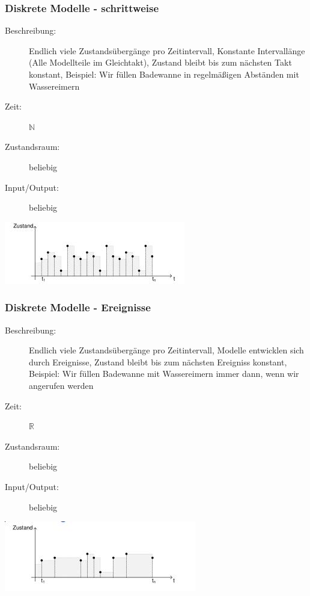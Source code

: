 \documentclass[11pt, fleqn, a4paper, leqno]{scrartcl} %
\begin{document}
		\subsubsection{Diskrete Modelle - schrittweise}
			\begin{description}
				\item[Beschreibung:] Endlich viele Zustandsübergänge pro Zeitintervall, Konstante Intervallänge (Alle Modellteile im Gleichtakt), Zustand bleibt bis zum nächsten Takt konstant, Beispiel: Wir füllen Badewanne in regelmäßigen Abständen mit Wassereimern
				\item[Zeit:]$\mathds{N}$
				\item[Zustandsraum:] beliebig
				\item[Input/Output:] beliebig
			\end{description}
			\begin{center}
				\includegraphics [scale=0.6]{images/diskret-schrittweise.jpg}
			\end{center}
		\subsubsection{Diskrete Modelle - Ereignisse}
			\begin{description}
				\item[Beschreibung:] Endlich viele Zustandsübergänge pro Zeitintervall, Modelle entwicklen sich durch Ereignisse, Zustand bleibt bis zum nächsten Ereigniss konstant, Beispiel: Wir füllen Badewanne mit Wassereimern immer dann, wenn wir angerufen werden
				\item[Zeit:] $\mathds{R}$
				\item[Zustandsraum:] beliebig
				\item[Input/Output:] beliebig
			\end{description}
			\begin{center}
				\includegraphics [scale=0.6]{images/diskret-ereignisse.jpg}
			\end{center}
\end{document}
